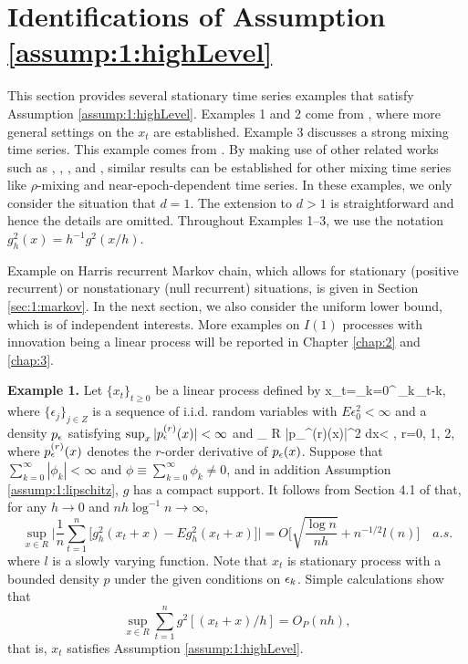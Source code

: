 \section{Identifications of Assumption \ref{assump:1:highLevel}} 
This section  provides several  stationary time series examples that satisfy Assumption \ref{assump:1:highLevel}. Examples 1 and 2  come from \cite{wuhuanghuang2010}, where more general settings on the $x_t$  are established. Example 3 discusses a strong mixing time series. This example comes from \cite{hansen2008}. By making use of other related works such as \cite{peligrad1992}, \cite{nzedoukhan2004},  \cite{masry1996}, \cite{bosq1998} and \cite{andrews1995}, similar results can be established for other mixing time series like $\rho$-mixing  and near-epoch-dependent time series. In these examples, we only consider the situation that $d=1$. The extension to $d> 1$ is straightforward and hence  the details are omitted. Throughout Examples 1--3, we use the notation $g^2_h(x)= h^{-1}g^2(x/h)$.

Example on Harris recurrent Markov chain, which allows for stationary (positive recurrent) or nonstationary (null recurrent) situations, is given in Section \ref{sec:1:markov}. In the next section, we also consider the uniform lower bound, which is of independent interests.
More examples on $I(1)$ processes with innovation being a linear process will be reported in Chapter \ref{chap:2} and \ref{chap:3}.

\medskip
{\bf Example 1.} Let $\{x_{t}\}_{t\geq 0}$ be a linear process defined by
\bestar
x_{t}=\sum_{k=0}^{\infty }\,\phi _{k}\,\epsilon_{t-k},
\eestar
where $\{\epsilon _{j} \}_{j\in Z}$ is a sequence of i.i.d.
random variables with $E\epsilon_{0}^{2}<\infty$ and a density $p_\epsilon$ satisfying $\sup_x|p_\epsilon^{(r)}(x)|<\infty$ and
\bestar
\int_{ R} |p_\ep^{(r)}(x)|^2  dx< \infty, \quad r=0, 1, 2,
\eestar
where $p_\epsilon^{(r)}(x)$ denotes the $r$-order derivative of $p_\epsilon(x)$. Suppose that $\sum_{k=0}^\infty |\phi_k| < \infty$ and $\phi \equiv \sum_{k=0}^\infty \phi_k \ne 0$, and in addition Assumption \ref{assump:1:lipschitz}, $g$ has a compact support. It follows from Section 4.1 of \cite{wuhuanghuang2010} that,
 for any $h \rightarrow 0$ and $nh \log^{-1}n \rightarrow \infty$,
\begin{equation}
\sup_{x \in  R} \Big | \frac{1}{n} \sum_{t =1}^{n} \big[g_h^2(x_t + x) - Eg_h^2(x_t + x)\big] \Big | = O \Big [\sqrt{\frac{\log n}{nh}} + n^{-1/2} l(n) \Big ] \quad a.s.
\end{equation}
where $l$ is a slowly varying function.
Note that $x_t$ is stationary process with a bounded density $p$ under the given conditions on $\epsilon_k$. Simple calculations show that
\begin{equation}
\sup_{x \in  R} \sum_{t =1}^{n} g^2[(x_t + x)/h] = O_P(nh),
\end{equation}
that is, $x_t$ satisfies Assumption \ref{assump:1:highLevel}.

